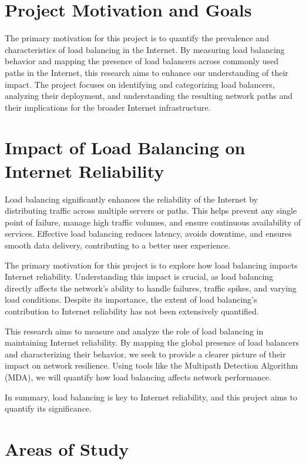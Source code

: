 \documentclass[12pt]{cwru_thesis}
\begin{document}
\section{Project Motivation and Goals}

The primary motivation for this project is to quantify the prevalence and characteristics of load balancing in the Internet. By measuring load balancing behavior and mapping the presence of load balancers across commonly used paths in the Internet, this research aims to enhance our understanding of their impact. The project focuses on identifying and categorizing load balancers, analyzing their deployment, and understanding the resulting network paths and their implications for the broader Internet infrastructure.

\section{Impact of Load Balancing on Internet Reliability}

Load balancing significantly enhances the reliability of the Internet by distributing traffic across multiple servers or paths. This helps prevent any single point of failure, manage high traffic volumes, and ensure continuous availability of services. Effective load balancing reduces latency, avoids downtime, and ensures smooth data delivery, contributing to a better user experience.

The primary motivation for this project is to explore how load balancing impacts Internet reliability. Understanding this impact is crucial, as load balancing directly affects the network's ability to handle failures, traffic spikes, and varying load conditions. Despite its importance, the extent of load balancing's contribution to Internet reliability has not been extensively quantified.

This research aims to measure and analyze the role of load balancing in maintaining Internet reliability. By mapping the global presence of load balancers and characterizing their behavior, we seek to provide a clearer picture of their impact on network resilience. Using tools like the Multipath Detection Algorithm (MDA), we will quantify how load balancing affects network performance.

In summary, load balancing is key to Internet reliability, and this project aims to quantify its significance.



\section{Areas of Study} \label{sec:Areassection}
\end{document}
